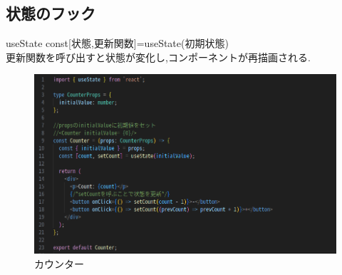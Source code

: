\documentclass[aspectratio=169]{beamer}
\begin{document}
\subsection{状態のフック}
\begin{frame}{useState}
    const[状態,更新関数]=useState(初期状態)\\
    更新関数を呼び出すと状態が変化し,コンポーネントが再描画される.\\
    \begin{figure}
        \centering
       \includegraphics[scale=0.3]{useState.png}
       \caption{カウンター}
    \end{figure}
\end{frame}
\end{document}
